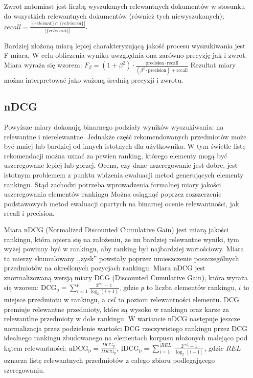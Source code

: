 \documentclass[pl]{minipw} %
\begin{document}
Zwrot natomiast jest liczbą wyszukanych relewantnych dokumentów w stosunku do wszystkich relewantnych dokumentów (również tych niewyszukanych); $recall=\frac{|\{relevant\} \cap \{retrieved\}|}{|\{relevant\}|}$.

Bardziej złożoną miarą lepiej charakteryzującą jakość procesu wyszukiwania jest F-miara. W celu obliczenia wyniku uwzględnia ona zarówno precyzję jak i zwrot. Miara wyraża się wzorem: $F_\beta = (1 + \beta^2) \cdot \frac{\mathrm{precision} \cdot \mathrm{recall}}{(\beta^2 \cdot \mathrm{precision}) + \mathrm{recall}}$ Rezultat miary można interpretować jako ważoną średnią precyzji i zwrotu. 


\subsection{nDCG}
Powyższe miary dokonują binarnego podziały wyników wyszukiwania: na relewantne i nierelewantne. Jednakże część rekomendowanych przedmiotów może być mniej lub bardziej od innych istotnych dla użytkownika. W tym świetle listę rekomendacji można uznać za pewien ranking, którego elementy mogą być uszeregowane lepiej lub gorzej. Ocena, czy dane uszeregowanie jest dobre, jest istotnym problemem z punktu widzenia ewaluacji metod generujących elementy rankingu. Stąd zachodzi potrzeba wprowadzenia formalnej miary jakości uszeregowania elementów rankingu Można osiągnąć poprzez rozszerzenie podstawowych metod ewaluacji opartych na binarnej ocenie relewantności, jak recall i precision.

Miara nDCG\cite{ndcg} (Normalized Discounted Cumulative Gain) jest miarą jakości rankingu, która opiera się na założeniu, że im bardziej relewantne wyniki, tym wyżej powinny być w rankingu, aby ranking był najbardziej wartościowy. Miara ta mierzy skumulowany ,,zysk'' powstały poprzez umieszczenie poszczególnych przedmiotów na określonych pozycjach rankingu. Miara nDCG jest znormalizowaną wersją miary DCG (Discounted Cumulative Gain), która wyraża się wzorem: ${\mathrm  {DCG_{{p}}}}=\sum _{{i=1}}^{{p}}{\frac  {2^{{rel_{{i}}}}-1}{\log _{{2}}(i+1)}}$, gdzie $p$ to liczba elementów rankingu, $i$ to miejsce przedmiotu w rankingu, a $rel$ to poziom relewantności elementu. DCG premiuje relewantne przedmioty, które są wysoko w rankingu oraz karze za relewantlne przedmioty w dole rankingu. W wariancie nDCG następuje jeszcze normalizacja przez podzielenie wartości DCG rzeczywistego rankingu przez DCG idealnego rankingu zbudowanego na elementach korpusu ułożonych malejąco pod kątem relewantności: ${\mathrm  {nDCG_{{p}}}}={\frac  {DCG_{{p}}}{IDCG_{{p}}}}$, $\mathrm {IDCG_{p}} =\sum _{i=1}^{|REL|}{\frac {2^{rel_{i}}-1}{\log _{2}(i+1)}}$, gdzie $REL$ oznacza listę relewantnych przedmiotów z całego zbioru podlegającego szeregowaniu.
\end{document}
